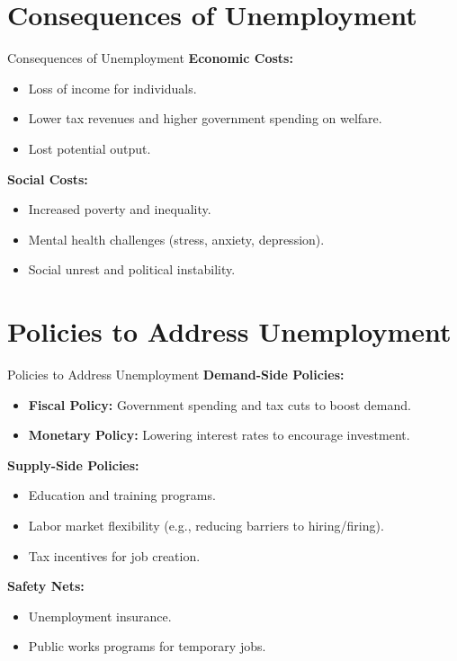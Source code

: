 \documentclass{beamer}
\begin{document}
\section{Consequences of Unemployment}
\begin{frame}{Consequences of Unemployment}
    \textbf{Economic Costs:}
    \begin{itemize}
        \item Loss of income for individuals.
        \item Lower tax revenues and higher government spending on welfare.
        \item Lost potential output.
    \end{itemize}
    \textbf{Social Costs:}
    \begin{itemize}
        \item Increased poverty and inequality.
        \item Mental health challenges (stress, anxiety, depression).
        \item Social unrest and political instability.
    \end{itemize}
\end{frame}

\section{Policies to Address Unemployment}
\begin{frame}{Policies to Address Unemployment}
    \textbf{Demand-Side Policies:}
    \begin{itemize}
        \item \textbf{Fiscal Policy:} Government spending and tax cuts to boost demand.
        \item \textbf{Monetary Policy:} Lowering interest rates to encourage investment.
    \end{itemize}
    \textbf{Supply-Side Policies:}
    \begin{itemize}
        \item Education and training programs.
        \item Labor market flexibility (e.g., reducing barriers to hiring/firing).
        \item Tax incentives for job creation.
    \end{itemize}
    \textbf{Safety Nets:}
    \begin{itemize}
        \item Unemployment insurance.
        \item Public works programs for temporary jobs.
    \end{itemize}
\end{frame}
\end{document}
